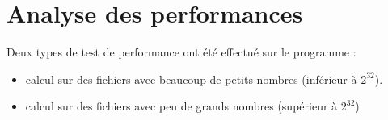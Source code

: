 \documentclass[12pt]{article}
\begin{document}
\section{Analyse des performances}

Deux types de test de performance ont été effectué sur le programme : 
\begin{itemize}
\item calcul sur des fichiers avec beaucoup de petits nombres (inférieur à  $2^{32}$).
\item calcul sur des fichiers avec peu de grands nombres (supérieur à $2^{32}$)
\end{itemize}
\end{document}
